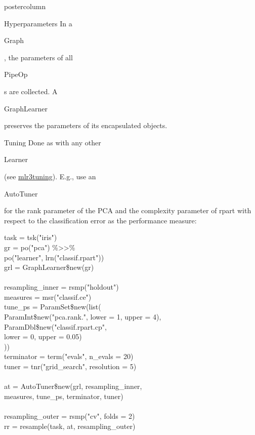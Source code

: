 \documentclass{beamer}
\newcommand{\codeinline}[1]{\begin{codeboxinline}#1\end{codeboxinline}}
\begin{document}
\begin{frame}[fragile]{}
\begin{columns}
\begin{column}{.245\textwidth}
\begin{beamercolorbox}[center]{postercolumn}
\begin{minipage}{.98\textwidth}
{\begin{myblock}{Hyperparameters}
              In a \codeinline{Graph}, the parameters of all \codeinline{PipeOp}s are collected. A \codeinline{GraphLearner} preserves the parameters of its encapsulated objects.
            \end{myblock}
            \begin{myblock}{Tuning}
              Done as with any other \codeinline{Learner} (see \href{FIXME:CheatsheetLink}{mlr3tuning}). E.g., use an \codeinline{AutoTuner} for the rank parameter of the PCA and the complexity parameter of rpart with respect to the classification error as the performance measure:
              \begin{codeboxexample}
						  {\footnotesize
                task = tsk("iris")\\
                gr = po("pca") \%>{}>\%\\
                \hspace*{1ex} po("learner", lrn("classif.rpart"))\\
                grl = GraphLearner\$new(gr)\\
                \ \\
                resampling\_inner = rsmp("holdout")\\
                measures = msr("classif.ce")\\
                tune\_ps = ParamSet\$new(list(\\
                \hspace*{1ex} ParamInt\$new("pca.rank.", lower = 1, upper = 4),\\
                \hspace*{1ex} ParamDbl\$new("classif.rpart.cp",\\
                \hspace*{2ex} lower = 0, upper = 0.05)\\
                ))\\
                terminator = term("evals", n\_evals = 20)\\
                tuner = tnr("grid\_search", resolution = 5)\\
                \ \\
                at = AutoTuner\$new(grl, resampling\_inner,\\
                \hspace*{1ex} measures, tune\_ps, terminator, tuner)\\
                \ \\
                resampling\_outer = rsmp("cv", folds = 2)\\
                rr = resample(task, at, resampling\_outer)}
					    \end{codeboxexample}
            \end{myblock}
						\vfill}
				\end{minipage}
			\end{beamercolorbox}
		\end{column}
	\end{columns}
\end{frame}
\end{document}
